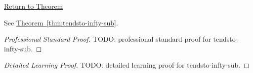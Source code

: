 \newpage
{}
\label{prf:tendsto-infty-sub}

\begin{remark*}[Return]
\hyperref[thm:tendsto-infty-sub]{Return to Theorem}
\end{remark*}

\begin{theorem*}
See \hyperref[thm:tendsto-infty-sub]{Theorem~\ref*{thm:tendsto-infty-sub}}.
\end{theorem*}

\begin{proof}[Professional Standard Proof]
\LRAProofBodyStart
TODO: professional standard proof for tendsto-infty-sub.
\end{proof}

\begin{proof}[Detailed Learning Proof]
\LRAProofBodyStart
TODO: detailed learning proof for tendsto-infty-sub.
\end{proof}

\begin{remark*}
\end{remark*}

\begin{dependencies}
\NoLocalDependencies
\end{dependencies}

\clearpage
